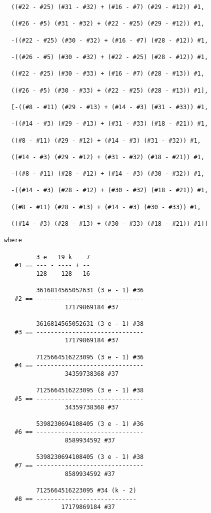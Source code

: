 \documentclass[../main.tex]{subfiles}
\begin{document}
\begin{verbatim}
  ((#22 - #25) (#31 - #32) + (#16 - #7) (#29 - #12)) #1, 
  
  ((#26 - #5) (#31 - #32) + (#22 - #25) (#29 - #12)) #1,

  -((#22 - #25) (#30 - #32) + (#16 - #7) (#28 - #12)) #1, 
  
  -((#26 - #5) (#30 - #32) + (#22 - #25) (#28 - #12)) #1,

  ((#22 - #25) (#30 - #33) + (#16 - #7) (#28 - #13)) #1, 
  
  ((#26 - #5) (#30 - #33) + (#22 - #25) (#28 - #13)) #1],

  [-((#8 - #11) (#29 - #13) + (#14 - #3) (#31 - #33)) #1, 
  
  -((#14 - #3) (#29 - #13) + (#31 - #33) (#18 - #21)) #1,

  ((#8 - #11) (#29 - #12) + (#14 - #3) (#31 - #32)) #1, 
  
  ((#14 - #3) (#29 - #12) + (#31 - #32) (#18 - #21)) #1,

  -((#8 - #11) (#28 - #12) + (#14 - #3) (#30 - #32)) #1, 
  
  -((#14 - #3) (#28 - #12) + (#30 - #32) (#18 - #21)) #1,

  ((#8 - #11) (#28 - #13) + (#14 - #3) (#30 - #33)) #1, 
  
  ((#14 - #3) (#28 - #13) + (#30 - #33) (#18 - #21)) #1]]

where

         3 e   19 k    7
   #1 == --- - ---- + --
         128    128   16

         3616814565052631 (3 e - 1) #36
   #2 == ------------------------------
                 17179869184 #37

         3616814565052631 (3 e - 1) #38
   #3 == ------------------------------
                 17179869184 #37

         7125664516223095 (3 e - 1) #36
   #4 == ------------------------------
                 34359738368 #37

         7125664516223095 (3 e - 1) #38
   #5 == ------------------------------
                 34359738368 #37

         5398230694108405 (3 e - 1) #36
   #6 == ------------------------------
                 8589934592 #37

         5398230694108405 (3 e - 1) #38
   #7 == ------------------------------
                 8589934592 #37

         7125664516223095 #34 (k - 2)
   #8 == ----------------------------
                17179869184 #37


\end{verbatim}
\end{document}
